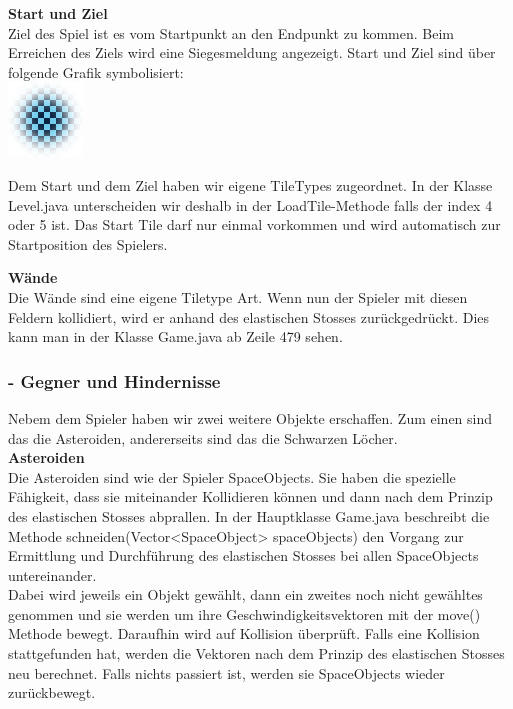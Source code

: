 \documentclass[12pt,a4paper]{scrartcl}
\begin{document}
\textbf{Start und Ziel}\\
Ziel des Spiel ist es vom Startpunkt an den Endpunkt zu kommen. Beim Erreichen des Ziels wird eine Siegesmeldung
angezeigt. Start und Ziel sind über folgende Grafik symbolisiert:\\

\includegraphics[scale=0.5]{img/goal.png}

Dem Start und dem Ziel haben wir eigene TileTypes zugeordnet.
In der Klasse Level.java unterscheiden wir deshalb in der LoadTile-Methode falls der index 4 oder 5 ist.
Das Start Tile darf nur einmal vorkommen und wird automatisch zur Startposition des Spielers.

\textbf{Wände}\\
Die Wände sind eine eigene Tiletype Art.
Wenn nun der Spieler mit diesen Feldern kollidiert, wird er anhand des elastischen Stosses zurückgedrückt.
Dies kann man in der Klasse Game.java ab Zeile 479 sehen.

\subsubsection{- Gegner und Hindernisse}

Nebem dem Spieler haben wir zwei weitere Objekte erschaffen.
Zum einen sind das die Asteroiden, andererseits sind das die Schwarzen Löcher.		\\

\textbf{Asteroiden}		\\
Die Asteroiden sind wie der Spieler SpaceObjects. Sie haben die spezielle Fähigkeit, dass sie miteinander Kollidieren können und dann nach dem Prinzip des elastischen Stosses abprallen.
In der Hauptklasse Game.java beschreibt die Methode schneiden(Vector<SpaceObject> spaceObjects) den Vorgang zur Ermittlung und Durchführung des elastischen Stosses bei allen SpaceObjects untereinander. \\
Dabei wird jeweils ein Objekt gewählt, dann ein zweites noch nicht gewähltes genommen und sie werden um ihre Geschwindigkeitsvektoren mit der move() Methode bewegt. 
Daraufhin wird auf Kollision überprüft.
Falls eine Kollision stattgefunden hat, werden die Vektoren nach dem Prinzip des elastischen Stosses neu berechnet.
Falls nichts passiert ist, werden sie SpaceObjects wieder zurückbewegt.
\end{document}
